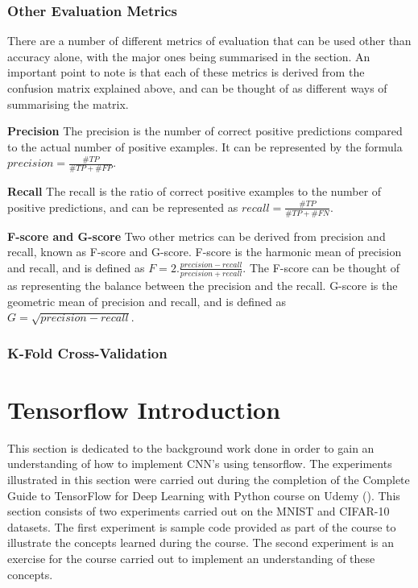 \documentclass[12pt]{report}
\begin{document}
\subsubsection{Other Evaluation Metrics}
\begin{flushleft}
There are a number of different metrics of evaluation that can be used other than accuracy alone, with the major ones being summarised in the section. An important point to note is that each of these metrics is derived from the confusion matrix explained above, and can be thought of as different ways of summarising the matrix.

\vspace{0.5cm}
\textbf{Precision}
\linebreak
The precision is the number of correct positive predictions compared to the actual number of positive examples. It can be represented by the formula $precision = \frac{\#TP}{\#TP + \#FP}$.

\vspace{0.5cm}
\textbf{Recall}
\linebreak
The recall is the ratio of correct positive examples to the number of positive predictions, and can be represented as $recall = \frac{\#TP}{\#TP + \#FN}$.

\vspace{0.5cm}
\textbf{F-score and G-score}
\linebreak
Two other metrics can be derived from precision and recall, known as F-score and G-score. F-score is the harmonic mean of precision and recall, and is defined as 
$F = 2. \frac{precision - recall}{precision + recall}$. The F-score can be thought of as representing the balance between the precision and the recall.
\linebreak
G-score is the geometric mean of precision and recall, and is defined as $G = \sqrt{precision - recall}$.

\end{flushleft}

\subsubsection{K-Fold Cross-Validation}

\section{Tensorflow Introduction}

This section is dedicated to the background work done in order to gain an understanding of how to implement CNN's using tensorflow. The experiments illustrated in this section were carried out during the completion of the Complete Guide to TensorFlow for Deep Learning with Python course on Udemy (\cite{udemy}). This section consists of two experiments carried out on the MNIST and CIFAR-10 datasets. The first experiment is sample code provided as part of the course to illustrate the concepts learned during the course. The second experiment is an exercise for the course carried out to implement an understanding of these concepts.
\end{document}
